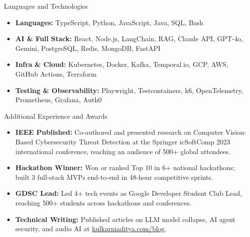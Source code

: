 \documentclass[]{mcdowellcv}
\begin{document}
\begin{cvsection}{Languages and Technologies}
  \begin{cvsubsection}{}{}{}
    \begin{itemize}
      \item \textbf{Languages:} TypeScript, Python, JavaScript, Java, SQL, Bash
      \item \textbf{AI \& Full Stack:} React, Node.js, LangChain, RAG, Claude API, GPT-4o, Gemini, PostgreSQL, Redis, MongoDB, FastAPI
      \item \textbf{Infra \& Cloud:} Kubernetes, Docker, Kafka, Temporal.io, GCP, AWS, GitHub Actions, Terraform
      \item \textbf{Testing \& Observability:} Playwright, Testcontainers, k6, OpenTelemetry, Prometheus, Grafana, Auth0
    \end{itemize}
  \end{cvsubsection}
\end{cvsection}

\begin{cvsection}{Additional Experience and Awards}
  \begin{cvsubsection}{}{}{}
    \begin{itemize}
      \item \textbf{IEEE Published:} Co-authored and presented research on Computer Vision-Based Cybersecurity Threat Detection at the Springer icSoftComp 2023 international conference, reaching an audience of 500+ global attendees.
      \item \textbf{Hackathon Winner:} Won or ranked Top 10 in 6+ national hackathons; built 3 full-stack MVPs end-to-end in 48-hour competitive sprints.
      \item \textbf{GDSC Lead:} Led 4+ tech events as Google Developer Student Club Lead, reaching 500+ students across hackathons and conferences.
      \item \textbf{Technical Writing:} Published articles on LLM model collapse, AI agent security, and audio AI at \href{https://www.kulkarniaditya.com/blog}{kulkarniaditya.com/blog}.
    \end{itemize}
  \end{cvsubsection}
\end{cvsection}
\end{document}
